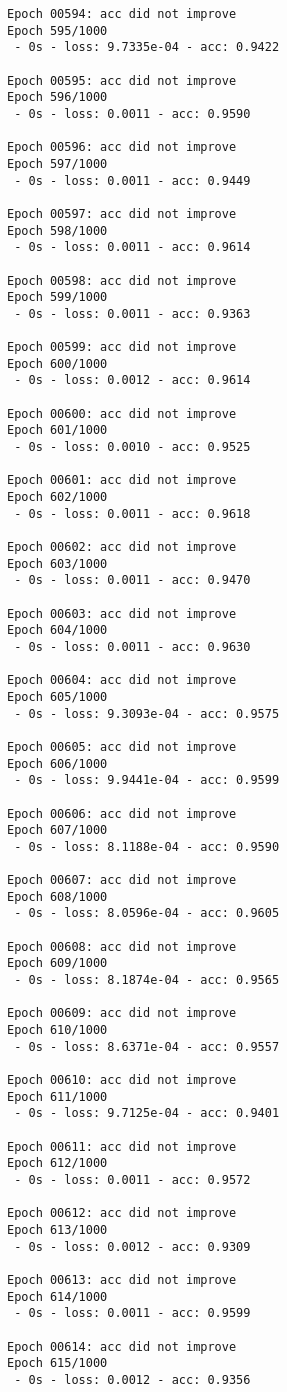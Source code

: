 \documentclass[11pt]{article}
\begin{document}
\begin{Verbatim}[commandchars=\\\{\}]
Epoch 00594: acc did not improve
Epoch 595/1000
 - 0s - loss: 9.7335e-04 - acc: 0.9422

Epoch 00595: acc did not improve
Epoch 596/1000
 - 0s - loss: 0.0011 - acc: 0.9590

Epoch 00596: acc did not improve
Epoch 597/1000
 - 0s - loss: 0.0011 - acc: 0.9449

Epoch 00597: acc did not improve
Epoch 598/1000
 - 0s - loss: 0.0011 - acc: 0.9614

Epoch 00598: acc did not improve
Epoch 599/1000
 - 0s - loss: 0.0011 - acc: 0.9363

Epoch 00599: acc did not improve
Epoch 600/1000
 - 0s - loss: 0.0012 - acc: 0.9614

Epoch 00600: acc did not improve
Epoch 601/1000
 - 0s - loss: 0.0010 - acc: 0.9525

Epoch 00601: acc did not improve
Epoch 602/1000
 - 0s - loss: 0.0011 - acc: 0.9618

Epoch 00602: acc did not improve
Epoch 603/1000
 - 0s - loss: 0.0011 - acc: 0.9470

Epoch 00603: acc did not improve
Epoch 604/1000
 - 0s - loss: 0.0011 - acc: 0.9630

Epoch 00604: acc did not improve
Epoch 605/1000
 - 0s - loss: 9.3093e-04 - acc: 0.9575

Epoch 00605: acc did not improve
Epoch 606/1000
 - 0s - loss: 9.9441e-04 - acc: 0.9599

Epoch 00606: acc did not improve
Epoch 607/1000
 - 0s - loss: 8.1188e-04 - acc: 0.9590

Epoch 00607: acc did not improve
Epoch 608/1000
 - 0s - loss: 8.0596e-04 - acc: 0.9605

Epoch 00608: acc did not improve
Epoch 609/1000
 - 0s - loss: 8.1874e-04 - acc: 0.9565

Epoch 00609: acc did not improve
Epoch 610/1000
 - 0s - loss: 8.6371e-04 - acc: 0.9557

Epoch 00610: acc did not improve
Epoch 611/1000
 - 0s - loss: 9.7125e-04 - acc: 0.9401

Epoch 00611: acc did not improve
Epoch 612/1000
 - 0s - loss: 0.0011 - acc: 0.9572

Epoch 00612: acc did not improve
Epoch 613/1000
 - 0s - loss: 0.0012 - acc: 0.9309

Epoch 00613: acc did not improve
Epoch 614/1000
 - 0s - loss: 0.0011 - acc: 0.9599

Epoch 00614: acc did not improve
Epoch 615/1000
 - 0s - loss: 0.0012 - acc: 0.9356


\end{Verbatim}
\end{document}
